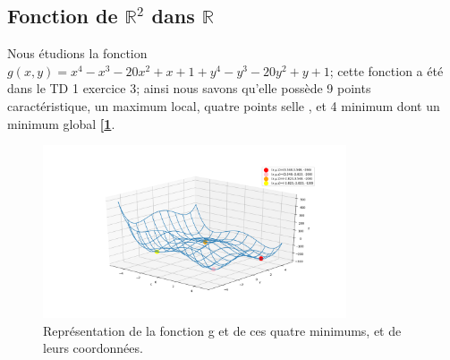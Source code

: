\documentclass[12pt]{article}
\begin{document}
\subsection{Fonction de $\mathbb{R}^2$ dans $\mathbb{R}$}
Nous étudions la fonction $g(x,y)= x^4-x^3-20x^2+x+1 +y^4-y^3-20y^2+y+1$; cette fonction a été dans le TD 1 exercice 3; ainsi nous savons qu'elle possède 9 points caractéristique, un maximum local, quatre points selle , et 4 minimum dont un minimum global \textbf{[\ref{Q21}}.
\begin{figure}[H]
\centering
\includegraphics[width=0.8\textwidth]{Q21.png}
\caption{Représentation de la fonction g et de ces quatre minimums, et de leurs coordonnées.}
\label{Q21}
\end{figure}
\end{document}
